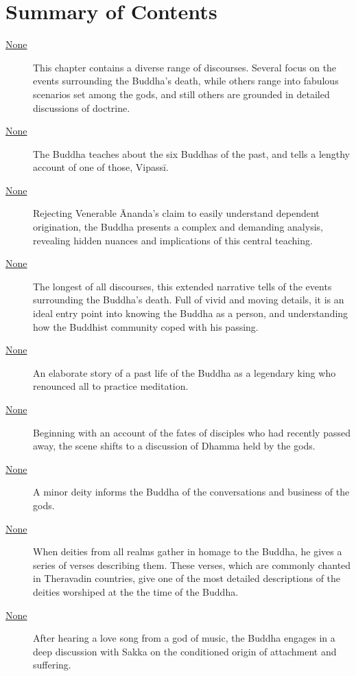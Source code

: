 \documentclass[12pt,openany]{book}%
\begin{document}
\newpage

\setlength{\parindent}{1.5em}%
\tableofcontents
\newpage
\pagestyle{fancy}
%
\chapter*{Summary of Contents}

\begin{description}%
\item[\href{\#dn{-}mahavagga}{None}] This chapter contains a diverse range of discourses. Several focus on the events surrounding the Buddha’s death, while others range into fabulous scenarios set among the gods, and still others are grounded in detailed discussions of doctrine.%
\item[\href{\#dn14}{None}] The Buddha teaches about the six Buddhas of the past, and tells a lengthy account of one of those, \textsanskrit{Vipassī}.%
\item[\href{\#dn15}{None}] Rejecting Venerable Ānanda’s claim to easily understand dependent origination, the Buddha presents a complex and demanding analysis, revealing hidden nuances and implications of this central teaching.%
\item[\href{\#dn16}{None}] The longest of all discourses, this extended narrative tells of the events surrounding the Buddha’s death. Full of vivid and moving details, it is an ideal entry point into knowing the Buddha as a person, and understanding how the Buddhist community coped with his passing.%
\item[\href{\#dn17}{None}] An elaborate story of a past life of the Buddha as a legendary king who renounced all to practice meditation.%
\item[\href{\#dn18}{None}] Beginning with an account of the fates of disciples who had recently passed away, the scene shifts to a discussion of Dhamma held by the gods.%
\item[\href{\#dn19}{None}] A minor deity informs the Buddha of the conversations and business of the gods.%
\item[\href{\#dn20}{None}] When deities from all realms gather in homage to the Buddha, he gives a series of verses describing them. These verses, which are commonly chanted in Theravadin countries, give one of the most detailed descriptions of the deities worshiped at the the time of the Buddha.%
\item[\href{\#dn21}{None}] After hearing a love song from a god of music, the Buddha engages in a deep discussion with Sakka on the conditioned origin of attachment and suffering.%

\end{description}
\end{document}
